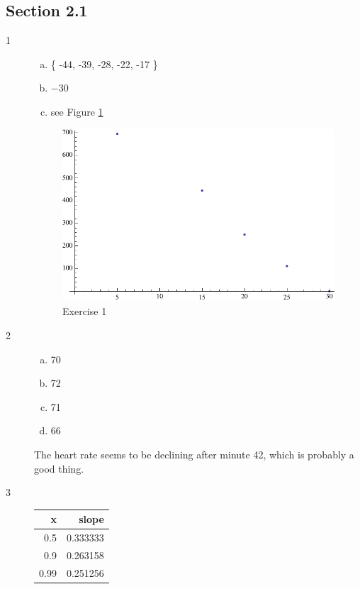 \documentclass[letterpaper]{exam}
\begin{document}
    \subsection{Section 2.1}
    \begin{description}

      \item[1]
        \begin{enumerate}[(a)]
          \item \{ -44, -39, -28, -22, -17 \}
          \item $-30$
          \item see Figure \ref{fig:ex01}
        \end{enumerate}

        \begin{figure}[H]
          \centering
          \includegraphics[scale = 0.5]{ex01.pdf}
          \caption{Exercise 1}
          \label{fig:ex01}
        \end{figure}

      \item[2]
        \begin{enumerate}[(a)]
          \item 70
          \item 72
          \item 71
          \item 66
        \end{enumerate}

        The heart rate seems to be declining after minute 42, which is probably
        a good thing.

      \item[3]
        \begin{tabular}[H]{rr}
          \toprule
          x   & slope \\
          \midrule
          0.5 & 0.333333 \\
          0.9 & 0.263158 \\
          0.99 & 0.251256 \\
        \end{tabular}


\end{description}
\end{document}
